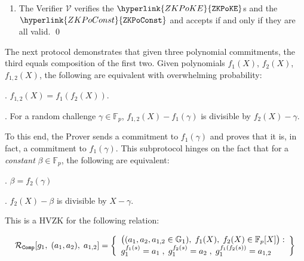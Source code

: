 \documentclass[11pt, lettersize, notitlepage, leqno, footskip=0.6cm]{article}
\newcommand{\bFp}{\mathbb{F}_p}
\newcommand{\mc}{\mathcal}
\newcommand{\mb}{\mathbb}
\newcommand{\mbf}{\mathbf}
\newcommand{\be}{\beta}
\newcommand{\V}{\mc{V}}
\newcommand{\vs}{\vspace{-0.15cm}}
\newcommand{\noin}{\noindent}
\newcommand{\op}{overwhelming probability}
\newcommand{\sta}{\stackrel{?}{=}}
\newcommand{\e}{\mbf{e}}
\numberwithin{equation}{section}
\begin{document}
\begin{mdframed}
\begin{enumerate}[wide, labelwidth=!, labelindent=0pt, itemsep=-0.2ex]

\item The Verifier $\V$ verifies the $\hyperlink{ZKPoKE}{\tt{ZKPoKE}}$s and the $\hyperlink{ZKPoConst}{\tt{ZKPoConst}}$ and accepts if and only if they are all valid. \qed \end{enumerate}\end{mdframed}

\bigskip








The next protocol demonstrates that given three polynomial commitments, the third equals composition of the first two. Given polynomials $f_1(X)$, $f_2(X)$, $f_{1,2}(X)$, the following are equivalent with \op: \vspace{1.5mm}

\noin 1. $f_{1,2}(X) = f_1(f_2(X))$. \vspace{1mm}

\noin 2. For a random challenge $\gamma\in \bFp$, $f_{1,2}(X) - f_1(\gamma)$ is divisible by $f_2(X)- \gamma$. \vspace{2mm}

To this end, the Prover sends a commitment to $f_1(\gamma)$ and proves that it is, in fact, a commitment to $f_1(\gamma)$. This subprotocol hinges on the fact that for a \textit{constant} $\be \in \bFp$, the following are equivalent: \vspace{2mm}

\noin 1. $\be = f_2(\gamma)$ \vspace{1mm}

\noin 2. $f_2(X) - \be$ is divisible by $X-\gamma$. \vspace{2mm}

This is a HVZK for the following relation:

\vs $$\mc{R}_{\tt{Comp}}[g_1,\;(a_1,a_2),\;a_{1,2}] = \left\{\begin{array}{l} 
\big((a_1,a_2, a_{1,2}\in\mb{G}_1),\; f_1(X),\; f_2(X)\in \bFp[X]\big):\\ g_1^{f_1(s)} = a_1\;,\; g_1^{f_2(s)} = a_2\;,\; g_1^{f_1(f_2(s))} = a_{1,2} \end{array}\right\}  $$
\end{document}
